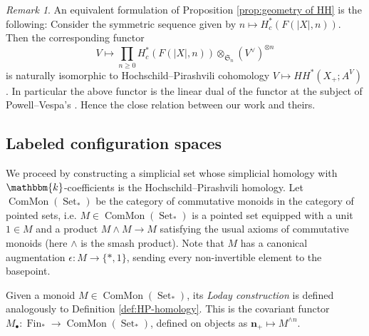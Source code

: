 \documentclass[12pt]{article}
\newcommand{\kk}{\mathbbm{k}}
\newcommand{\SymGroup}[1][n]{\mathfrak{S}_{#1}}
\newcommand{\n}[1][n]{\mathbf{#1}}
\newcommand{\FinPointedSet}[1]{\n[#1]_{+}}
\DeclareMathOperator{\Fin}{Fin}
\DeclareMathOperator{\Set}{Set}
\theoremstyle{plain}
\theoremstyle{definition}
\theoremstyle{remark}
\newtheorem{rmk}[thm]{Remark}
\begin{document}
\begin{rmk}
    An equivalent formulation of Proposition \ref{prop:geometry of HH} is the following: Consider the symmetric sequence given by $n \mapsto H^{*}_c\left( F(|X|,n)\right)$. Then the corresponding functor
    \begin{equation}\label{eq:Hochschild functor}
    V \mapsto \prod_{n\geq 0} H^{*}_c\left( F(|X|,n)\right)\otimes_{\SymGroup} (V^\vee)^{\otimes n}
    \end{equation}
    is naturally isomorphic to Hochschild--Pirashvili cohomology $V \mapsto HH^*(X_+; {A^V})$. In particular the above functor is the linear dual of the functor at the subject of Powell--Vespa's \cite{PV18}. Hence the close relation between our work and theirs.
\end{rmk}

\subsection{Labeled configuration spaces}
We proceed by constructing a simplicial set whose simplicial homology with $\kk$-coefficients is the Hochschild--Pirashvili homology. Let $\operatorname{ComMon}(\Set_{\ast})$ be the category of commutative monoids in the category of pointed sets, i.e. $M\in \operatorname{ComMon}(\Set_{\ast})$ is a pointed set equipped with a unit $1\in M$ and a product $M\wedge M \to M$ satisfying the usual axioms of commutative monoids (here $\wedge$ is the smash product). Note that $M$ has a canonical augmentation $\epsilon: M\to \{*,1\}$, sending every non-invertible element to the basepoint.

Given a monoid $M\in \operatorname{ComMon}(\Set_{\ast})$, its \emph{Loday construction} is defined analogously to Definition \ref{def:HP-homology}. This is the covariant functor $M_{\bullet}\colon \Fin_{\ast} \to \operatorname{ComMon}(\Set_{\ast})$, defined on objects as $\FinPointedSet{n} \mapsto M^{\wedge n}$.
\end{document}
